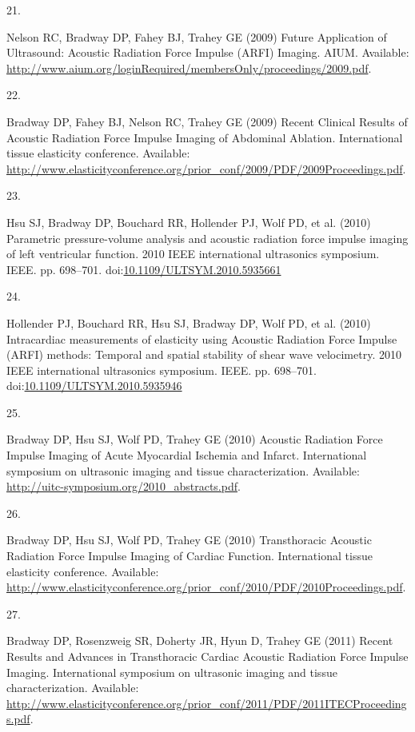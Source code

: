 \documentclass[
]{article}
\newlength{\cslhangindent}
\newlength{\csllabelwidth}
\newlength{\cslentryspacingunit} %
\newenvironment{CSLReferences}[2] %
 {%
  \setlength{\parindent}{0pt}
  \ifodd #1
  \let\oldpar\par
  \def\par{\hangindent=\cslhangindent\oldpar}
  \fi
  \setlength{\parskip}{#2\cslentryspacingunit}
 }%
 {}
\newcommand{\CSLLeftMargin}[1]{\parbox[t]{\csllabelwidth}{#1}}
\newcommand{\CSLRightInline}[1]{\parbox[t]{\linewidth - \csllabelwidth}{#1}\break}
\begin{document}
\begin{CSLReferences}{0}{0}
\leavevmode{}%
\CSLLeftMargin{21. }
\CSLRightInline{Nelson RC, Bradway DP, Fahey BJ, Trahey GE (2009)
{Future Application of Ultrasound: Acoustic Radiation Force Impulse
(ARFI) Imaging}. AIUM. Available:
\url{http://www.aium.org/loginRequired/membersOnly/proceedings/2009.pdf}.}

\leavevmode{}%
\CSLLeftMargin{22. }
\CSLRightInline{Bradway DP, Fahey BJ, Nelson RC, Trahey GE (2009)
{Recent Clinical Results of Acoustic Radiation Force Impulse Imaging of
Abdominal Ablation}. International tissue elasticity conference.
Available:
\url{http://www.elasticityconference.org/prior_conf/2009/PDF/2009Proceedings.pdf}.}

\leavevmode{}%
\CSLLeftMargin{23. }
\CSLRightInline{Hsu SJ, Bradway DP, Bouchard RR, Hollender PJ, Wolf PD,
et al. (2010) {Parametric pressure-volume analysis and acoustic
radiation force impulse imaging of left ventricular function}. 2010 IEEE
international ultrasonics symposium. IEEE. pp. 698--701.
doi:\href{https://doi.org/10.1109/ULTSYM.2010.5935661}{10.1109/ULTSYM.2010.5935661}}

\leavevmode{}%
\CSLLeftMargin{24. }
\CSLRightInline{Hollender PJ, Bouchard RR, Hsu SJ, Bradway DP, Wolf PD,
et al. (2010) {Intracardiac measurements of elasticity using Acoustic
Radiation Force Impulse (ARFI) methods: Temporal and spatial stability
of shear wave velocimetry}. 2010 IEEE international ultrasonics
symposium. IEEE. pp. 698--701.
doi:\href{https://doi.org/10.1109/ULTSYM.2010.5935946}{10.1109/ULTSYM.2010.5935946}}

\leavevmode{}%
\CSLLeftMargin{25. }
\CSLRightInline{Bradway DP, Hsu SJ, Wolf PD, Trahey GE (2010) {Acoustic
Radiation Force Impulse Imaging of Acute Myocardial Ischemia and
Infarct}. International symposium on ultrasonic imaging and tissue
characterization. Available:
\url{http://uitc-symposium.org/2010_abstracts.pdf}.}

\leavevmode{}%
\CSLLeftMargin{26. }
\CSLRightInline{Bradway DP, Hsu SJ, Wolf PD, Trahey GE (2010)
{Transthoracic Acoustic Radiation Force Impulse Imaging of Cardiac
Function}. International tissue elasticity conference. Available:
\url{http://www.elasticityconference.org/prior_conf/2010/PDF/2010Proceedings.pdf}.}

\leavevmode{}%
\CSLLeftMargin{27. }
\CSLRightInline{Bradway DP, Rosenzweig SR, Doherty JR, Hyun D, Trahey GE
(2011) {Recent Results and Advances in Transthoracic Cardiac Acoustic
Radiation Force Impulse Imaging}. International symposium on ultrasonic
imaging and tissue characterization. Available:
\url{http://www.elasticityconference.org/prior_conf/2011/PDF/2011ITECProceedings.pdf}.}


\end{CSLReferences}
\end{document}

